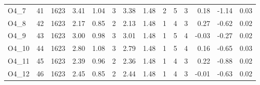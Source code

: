\begin{tabular}{lrrrrrrrrrrrrr}
\addlinespace
O4\_7 & 41 & 1623 & 3.41 & 1.04 & 3 & 3.38 & 1.48 & 2 & 5 & 3 & 0.18 & -1.14 & 0.03\\
O4\_8 & 42 & 1623 & 2.17 & 0.85 & 2 & 2.13 & 1.48 & 1 & 4 & 3 & 0.27 & -0.62 & 0.02\\
O4\_9 & 43 & 1623 & 3.00 & 0.98 & 3 & 3.01 & 1.48 & 1 & 5 & 4 & -0.03 & -0.27 & 0.02\\
O4\_10 & 44 & 1623 & 2.80 & 1.08 & 3 & 2.79 & 1.48 & 1 & 5 & 4 & 0.16 & -0.65 & 0.03\\
O4\_11 & 45 & 1623 & 2.39 & 0.96 & 2 & 2.36 & 1.48 & 1 & 4 & 3 & 0.22 & -0.88 & 0.02\\
\addlinespace
O4\_12 & 46 & 1623 & 2.45 & 0.85 & 2 & 2.44 & 1.48 & 1 & 4 & 3 & -0.01 & -0.63 & 0.02\\
\bottomrule
\end{tabular}
